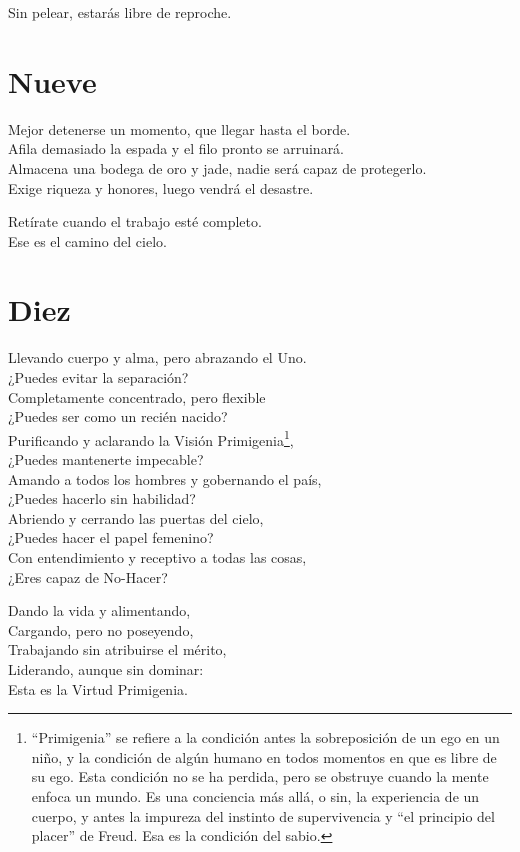 \documentclass[book,b5paper,hidelinks,final]{memoir}
\begin{document}
	Sin pelear, estarás libre de reproche.
	
	\chapter*{Nueve}
	
	Mejor detenerse un momento, que llegar hasta el borde.\\
	Afila demasiado la espada y el filo pronto se arruinará.\\
	Almacena una bodega de oro y jade, nadie será capaz de protegerlo.\\
	Exige riqueza y honores, luego vendrá el desastre.
	
	Retírate cuando el trabajo esté completo.\\
	Ese es el camino del cielo.
	
	\chapter*{Diez}
	
	Llevando cuerpo y alma, pero abrazando el Uno.\\
	¿Puedes evitar la separación?\\
	Completamente concentrado, pero flexible\\
	¿Puedes ser como un recién nacido?\\
	Purificando y aclarando la Visión Primigenia\footnote{``Primigenia'' se refiere a la condición antes la sobreposición de un
		ego en un niño, y la condición de algún humano en todos momentos en que
		es libre de su ego. Esta condición no se ha perdida, pero se obstruye
		cuando la mente enfoca un mundo. Es una conciencia más allá, o sin, la
		experiencia de un cuerpo, y antes la impureza del instinto de
		supervivencia y ``el principio del placer'' de Freud. Esa es la
		condición del sabio.},\\
	¿Puedes mantenerte impecable?\\
	Amando a todos los hombres y gobernando el país,\\
	¿Puedes hacerlo sin habilidad?\\
	Abriendo y cerrando las puertas del cielo,\\
	¿Puedes hacer el papel femenino?\\
	Con entendimiento y receptivo a todas las cosas,\\
	¿Eres capaz de No-Hacer?
	
	Dando la vida y alimentando,\\
	Cargando, pero no poseyendo,\\
	Trabajando sin atribuirse el mérito,\\
	Liderando, aunque sin dominar:\\
	Esta es la Virtud Primigenia.
	
\end{document}
